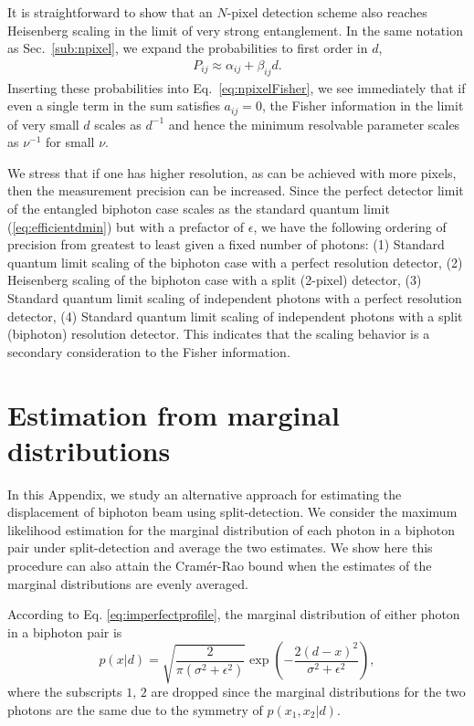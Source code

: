 It is straightforward to show that an $N$-pixel detection scheme also reaches Heisenberg scaling in the limit of very strong entanglement.  
In the same notation as Sec.~\ref{sub:npixel}, we expand the probabilities to first order in $d$,
\begin{align}
P_{ij} \approx \alpha_{ij} + \beta_{ij} d.
\end{align}
Inserting these probabilities into Eq.~\eqref{eq:npixelFisher}, we see immediately that if even a single term in the sum satisfies $a_{ij} = 0$, the Fisher information in the limit of very small $d$ scales as $d^{-1}$ and hence the minimum resolvable parameter scales as $\nu^{-1}$ for small $\nu$.

We stress that if one has higher resolution, as can be achieved with more pixels, then the measurement precision can be increased.  Since the perfect detector limit of the entangled biphoton case scales as the standard quantum limit (\ref{eq:efficientdmin}) but with a prefactor of $\epsilon$, we have the following ordering of precision from greatest to least given a fixed number of photons: (1) Standard quantum limit scaling of the biphoton case with a perfect resolution detector, (2) Heisenberg scaling of the biphoton case with a split (2-pixel) detector, (3)  Standard quantum limit scaling of independent photons with a perfect resolution detector, (4)  Standard quantum limit scaling of independent photons with a split (biphoton) resolution detector.  This indicates that the scaling behavior is a secondary consideration to the Fisher information. 

\section{Estimation from marginal distributions}

In this Appendix, we study an alternative approach for estimating the  displacement of biphoton beam using split-detection. We consider the maximum likelihood estimation for the marginal distribution of each photon in a biphoton pair under split-detection and average the two estimates. We show here this procedure can also attain the Cram\'er-Rao bound when the estimates of the marginal distributions are evenly averaged.

According to Eq. \eqref{eq:imperfectprofile}, the marginal distribution of either photon in a biphoton pair is
\begin{equation}
p(x|d)=\sqrt{\frac{2}{\pi(\sigma^{2}+\epsilon^{2})}}\exp\left(-\frac{2(d-x)^{2}}{\sigma^{2}+\epsilon^{2}}\right),\label{eq:marginal distribution}
\end{equation}
where the subscripts $1,\,2$ are dropped since the marginal distributions
for the two photons are the same due to the symmetry of $p(x_{1},x_{2}|d)$.

